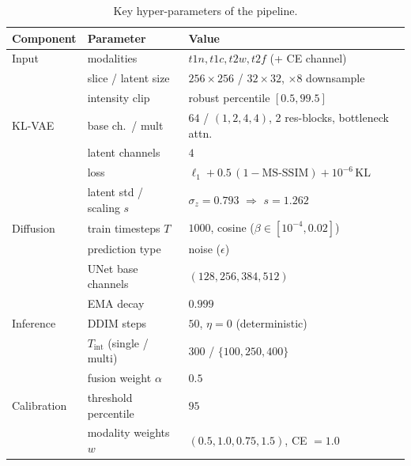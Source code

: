 \documentclass[12pt, a4paper]{article}
\begin{document}
\begin{table}[h!]
    \centering
    \caption{Key hyper-parameters of the pipeline.}
    \label{tab:hparams}
    \begin{tabular}{@{}lll@{}}
        \toprule
        \textbf{Component} & \textbf{Parameter} & \textbf{Value} \\
        \midrule
        Input            & modalities                 & $t1n, t1c, t2w, t2f$ (+ CE channel) \\
                         & slice / latent size        & $256\times256$ / $32\times32$, $\times8$ downsample \\
                         & intensity clip             & robust percentile $[0.5, 99.5]$ \\
        \midrule
        KL-VAE           & base ch.\ / mult           & $64$ / $(1,2,4,4)$, 2 res-blocks, bottleneck attn. \\
                         & latent channels            & $4$ \\
                         & loss                       & $\ell_1 + 0.5\,(1-\text{MS-SSIM}) + 10^{-6}\,\mathrm{KL}$ \\
                         & latent std / scaling $s$   & $\sigma_z = 0.793$ \;$\Rightarrow$\; $s = 1.262$ \\
        \midrule
        Diffusion        & train timesteps $T$        & $1000$, cosine ($\beta\in[10^{-4}, 0.02]$) \\
                         & prediction type           & noise ($\epsilon$) \\
                         & UNet base channels        & $(128, 256, 384, 512)$ \\
                         & EMA decay                 & $0.999$ \\
        \midrule
        Inference        & DDIM steps                & $50$, $\eta = 0$ (deterministic) \\
                         & $T_{\text{int}}$ (single / multi) & $300$ \;/\; $\{100, 250, 400\}$ \\
                         & fusion weight $\alpha$    & $0.5$ \\
        \midrule
        Calibration      & threshold percentile      & $95$ \\
                         & modality weights $w$      & $(0.5, 1.0, 0.75, 1.5)$, CE $=1.0$ \\
        \bottomrule
    \end{tabular}
\end{table}
\end{document}
